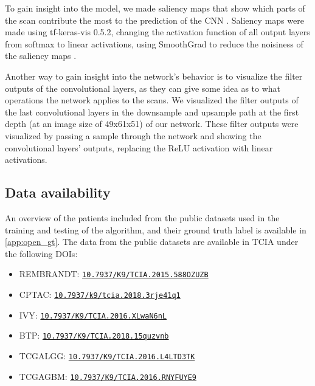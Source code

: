 To gain insight into the model, we made saliency maps that show which parts of the scan contribute the most to the prediction of the \gls{CNN} \autocite{smilkov2017smoothgrad}.
Saliency maps were made using tf-keras-vis 0.5.2, changing the activation function of all output layers from softmax to linear activations, using SmoothGrad to reduce the noisiness of the saliency maps \autocite{smilkov2017smoothgrad}.

Another way to gain insight into the network's behavior is to visualize the filter outputs of the convolutional layers, as they can give some idea as to what operations the network applies to the scans.
We visualized the filter outputs of the last convolutional layers in the downsample and upsample path at the first depth (at an image size of 49x61x51) of our network.
These filter outputs were visualized by passing a sample through the network and showing the convolutional layers' outputs, replacing the ReLU activation with linear activations.

\subsection{Data availability}
An overview of the patients included from the public datasets used in the training and testing of the algorithm, and their ground truth label is available in \cref{app:open_gt}.
The data from the public datasets are available in \gls{TCIA} under the following DOIs:

\begin{itemize}
    \item \gls{REMBRANDT}: \href{https://dx.doi.org/10.7937/K9/TCIA.2015.588OZUZB}{\texttt{10.7937/K9/TCIA.2015.588OZUZB}}
    \item \gls{CPTAC}: \href{https://dx.doi.org/10.7937/k9/tcia.2018.3rje41q1}{\texttt{10.7937/k9/tcia.2018.3rje41q1}}
    \item \gls{IVY}: \href{https://dx.doi.org/10.7937/K9/TCIA.2016.XLwaN6nL}{\texttt{10.7937/K9/TCIA.2016.XLwaN6nL}}
    \item \gls{BTP}: \href{https://dx.doi.org/10.7937/K9/TCIA.2018.15quzvnb}{\texttt{10.7937/K9/TCIA.2018.15quzvnb}}
    \item \gls{TCGALGG}: \href{https://dx.doi.org/10.7937/K9/TCIA.2016.L4LTD3TK}{\texttt{10.7937/K9/TCIA.2016.L4LTD3TK}}
    \item \gls{TCGAGBM}: \href{https://dx.doi.org/10.7937/K9/TCIA.2016.RNYFUYE9}{\texttt{10.7937/K9/TCIA.2016.RNYFUYE9}}

\end{itemize}

